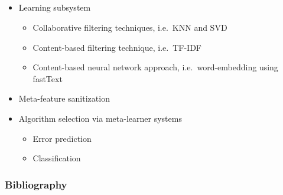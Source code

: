 \documentclass[aspectratio=169]{beamer}
\begin{document}
\subsection{\inserttitle}

\begin{frame}
	\frametitle{\insertsection}
	\framesubtitle{\insertsubsection}

	\begin{itemize}
		\item Learning subsystem
		\begin{itemize}
			\item Collaborative filtering techniques, i.e.~KNN and SVD
			\item Content-based filtering technique, i.e.~TF-IDF
			\item Content-based neural network approach, i.e.~word-embedding using fastText
		\end{itemize}
		\item Meta-feature sanitization
		\item Algorithm selection via meta-learner systems
		\begin{itemize}
			\item Error prediction
			\item Classification
		\end{itemize}
	\end{itemize}
\end{frame}

\appendix

\begin{frame}[shrink=20]
	\frametitle{Bibliography}

	\printbibliography%
\end{frame}
\end{document}
